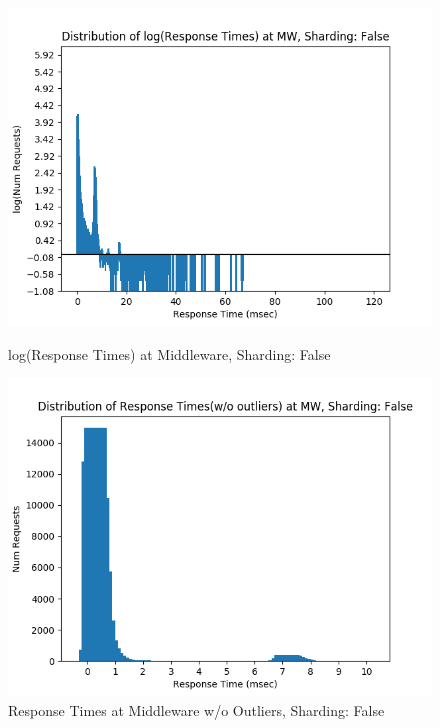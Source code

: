 \documentclass[11pt,a4paper]{article}
\begin{document}
\begin{figure}[H]
	\captionsetup{font=scriptsize,labelfont=scriptsize,justification=centering}
	\centering
	\begin{minipage}{0.5\textwidth}
		\centering
		\includegraphics[scale=0.525]{images/5_mw_log_hist_shard_False.png}
		\caption{log(Response Times) at Middleware, Sharding: False}
	\end{minipage}\hfill
	\begin{minipage}{0.5\textwidth}
		\centering
		\includegraphics[scale=0.525]{images/5_mw_hist_no-outlier_shard_False.png}
		\caption{Response Times at Middleware w/o Outliers, Sharding: False}
	\end{minipage}
\end{figure}
\end{document}
